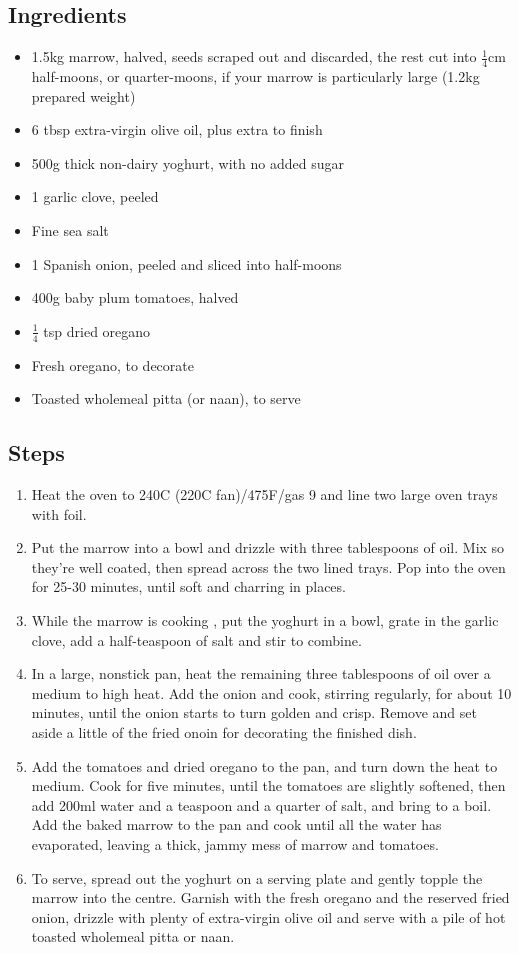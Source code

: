\documentclass{book}
\begin{document}
\subsection*{Ingredients}
\begin{itemize}
\item 1.5kg marrow, halved, seeds scraped out and discarded, the rest cut into $\frac{1}{4}$cm half-moons, or quarter-moons, if your marrow is particularly large (1.2kg prepared weight)
\item 6 tbsp extra-virgin olive oil, plus extra to finish
\item 500g thick non-dairy yoghurt, with no added sugar
\item 1 garlic clove, peeled
\item Fine sea salt 
\item 1 Spanish onion, peeled and sliced into half-moons 
\item 400g baby plum tomatoes, halved 
\item $\frac{1}{4}$ tsp dried oregano 
\item Fresh oregano, to decorate
\item Toasted wholemeal pitta (or naan), to serve
\end{itemize}

\subsection*{Steps}
\begin{enumerate}
\item Heat the oven to 240C (220C fan)/475F/gas 9 and line two large oven trays with foil.
\item Put the marrow into a bowl and drizzle with three tablespoons of oil. Mix so they’re well coated, then spread across the two lined trays. Pop into the oven for 25-30 minutes, until soft and charring in places.
\item While the marrow is cooking , put the yoghurt in a bowl, grate in the garlic clove, add a half-teaspoon of salt and stir to combine.
\item In a large, nonstick pan, heat the remaining three tablespoons of oil over a medium to high heat. Add the onion and cook, stirring regularly, for about 10 minutes, until the onion starts to turn golden and crisp. Remove and set aside a little of the fried onoin for decorating the finished dish.
\item Add the tomatoes and dried oregano to the pan, and turn down the heat to medium. Cook for five minutes, until the tomatoes are slightly softened, then add 200ml water and a teaspoon and a quarter of salt, and bring to a boil. Add the baked marrow to the pan and cook until all the water has evaporated, leaving a thick, jammy mess of marrow and tomatoes.
\item To serve, spread out the yoghurt on a serving plate and gently topple the marrow into the centre. Garnish with the fresh oregano and the reserved fried onion, drizzle with plenty of extra-virgin olive oil and serve with a pile of hot toasted wholemeal pitta or naan.
\end{enumerate}
\newpage
\end{document}
